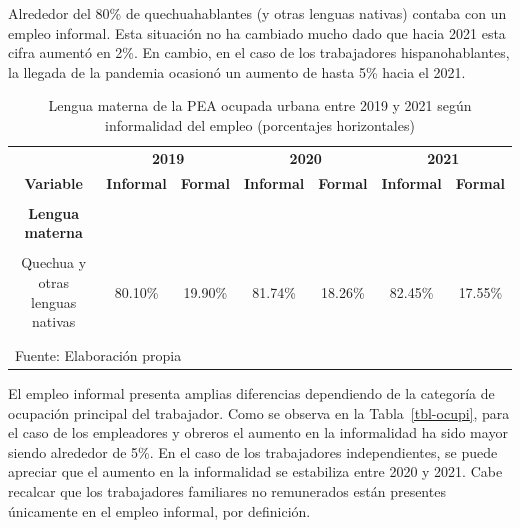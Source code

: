 \documentclass[
  letterpaper,
  12pt,
  oneside,
  spanish,
  doublespacing,
  headsepline,
  parskip]{MastersDoctoralThesis}
\begin{document}
Alrededor del 80\% de quechuahablantes (y otras lenguas nativas) contaba
con un empleo informal. Esta situación no ha cambiado mucho dado que
hacia 2021 esta cifra aumentó en 2\%. En cambio, en el caso de los
trabajadores hispanohablantes, la llegada de la pandemia ocasionó un
aumento de hasta 5\% hacia el 2021.

\hypertarget{tbl-leng}{}
\begin{table}[H]
\caption{\label{tbl-leng}Lengua materna de la PEA ocupada urbana entre 2019 y 2021 según
informalidad del empleo (porcentajes horizontales) }\tabularnewline

\centering\begingroup\fontsize{10}{12}\selectfont

\begin{tabular}{ccccccc}
\toprule
\multicolumn{1}{c}{ } & \multicolumn{2}{c}{\textbf{2019}} & \multicolumn{2}{c}{\textbf{2020}} & \multicolumn{2}{c}{\textbf{2021}} \\
\cmidrule(l{3pt}r{3pt}){2-3} \cmidrule(l{3pt}r{3pt}){4-5} \cmidrule(l{3pt}r{3pt}){6-7}
\textbf{Variable} & \textbf{Informal} & \textbf{Formal} & \textbf{Informal} & \textbf{Formal} & \textbf{Informal} & \textbf{Formal}\\
\midrule
\cellcolor{gray!6}{\textbf{Nacional}} & \cellcolor{gray!6}{66.40\%} & \cellcolor{gray!6}{33.60\%} & \cellcolor{gray!6}{68.42\%} & \cellcolor{gray!6}{31.58\%} & \cellcolor{gray!6}{71.41\%} & \cellcolor{gray!6}{28.59\%}\\
\textbf{Lengua materna} &  &  &  &  &  & \\
\cellcolor{gray!6}{Castellano} & \cellcolor{gray!6}{64.60\%} & \cellcolor{gray!6}{35.40\%} & \cellcolor{gray!6}{66.01\%} & \cellcolor{gray!6}{33.99\%} & \cellcolor{gray!6}{69.80\%} & \cellcolor{gray!6}{30.20\%}\\
Quechua y otras lenguas nativas & 80.10\% & 19.90\% & 81.74\% & 18.26\% & 82.45\% & 17.55\%\\
\cellcolor{gray!6}{Otros} & \cellcolor{gray!6}{60.12\%} & \cellcolor{gray!6}{39.88\%} & \cellcolor{gray!6}{82.54\%} & \cellcolor{gray!6}{17.46\%} & \cellcolor{gray!6}{70.81\%} & \cellcolor{gray!6}{29.19\%}\\
\bottomrule
\multicolumn{7}{l}{\textsuperscript{} Fuente: Elaboración propia}\\
\end{tabular}
\endgroup{}
\end{table}

El empleo informal presenta amplias diferencias dependiendo de la
categoría de ocupación principal del trabajador. Como se observa en la
Tabla~\ref{tbl-ocupi}, para el caso de los empleadores y obreros el
aumento en la informalidad ha sido mayor siendo alrededor de 5\%. En el
caso de los trabajadores independientes, se puede apreciar que el
aumento en la informalidad se estabiliza entre 2020 y 2021. Cabe
recalcar que los trabajadores familiares no remunerados están presentes
únicamente en el empleo informal, por definición.
\end{document}
